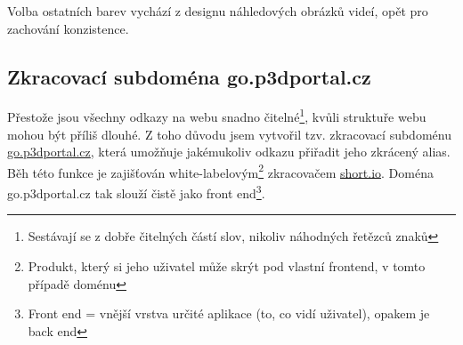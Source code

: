 Volba ostatních barev vychází z designu náhledových obrázků videí, opět pro zachování konzistence.

\subsection{Zkracovací subdoména go.p3dportal.cz}
Přestože jsou všechny odkazy na webu snadno čitelné\footnote{Sestávají se z dobře čitelných částí slov, nikoliv náhodných řetězců znaků}, kvůli struktuře webu mohou být příliš dlouhé.
Z toho důvodu jsem vytvořil tzv. zkracovací subdoménu \href{https://go.p3dportal.cz}{go.p3dportal.cz}, která umožňuje jakémukoliv odkazu přiřadit jeho zkrácený alias.
Běh této funkce je zajišťován white-labelovým\footnote{Produkt, který si jeho uživatel může skrýt pod vlastní frontend, v tomto případě doménu} zkracovačem \href{https://short.io}{short.io}.
Doména go.p3dportal.cz tak slouží čistě jako front end\footnote{Front end = vnější vrstva určité aplikace (to, co vidí uživatel), opakem je back end}.
